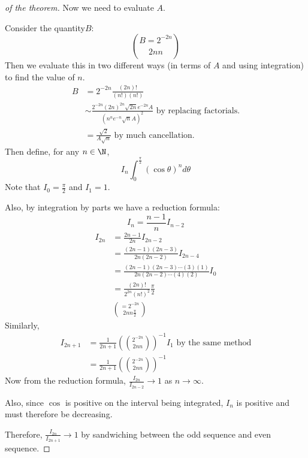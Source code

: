 \documentclass[../Main.tex]{subfiles}
\begin{document}
\begin{proof}[of the theorem]
    \par
    Now we need to evaluate $A$.\par
    Consider the quantity$B$:
    \begin{equation*}
        B = 2^{-2n} \choose{2n}{n}
    \end{equation*}
    Then we evaluate this in two different ways (in terms of $A$ and using integration) to find the value of $n$.
    \begin{align*}
        B &= 2^{-2n} \frac{(2n)!}{(n!)(n!)} \\
        &\sim \frac{2^{-2n} (2n)^{2n} \sqrt{2n} e^{-2n} A}{(n^n e^{-n} \sqrt{n} A)^2} \text{ by replacing factorials.} \\
        &= \frac{\sqrt{2}}{A \sqrt{n}} \text{ by much cancellation.}
    \end{align*}
    Then define, for any $n \in \N$,
    \begin{equation*}
        I_n \int_0^{\frac{\pi}{2}} (\cos{\theta})^n d\theta
    \end{equation*}
    Note that $I_0 = \frac{\pi}{2}$ and $I_1 = 1$.\par
    Also, by integration by parts we have a reduction formula:
    \begin{equation*}
        I_n = \frac{n-1}{n} I_{n-2}
    \end{equation*}
    \begin{align*}
        I_{2n} &= \frac{2n - 1}{2n} I_{2n-2} \\
        &= \frac{(2n-1)(2n-3)}{2n(2n-2)} I_{2n-4} \\
        &= \frac{(2n-1)(2n-3) \cdots(3)(1)}{2n(2n-2) \cdots (4)(2)} I_0 \\
        &= \frac{(2n)!}{2^{2n}(n!)^2} \frac{\pi}{2} \\
        &= 2^{-2n} \choose{2n}{n} \frac{\pi}{2}
    \end{align*}
    Similarly,
    \begin{align*}
        I_{2n+1} &= \frac{1}{2n+1}\left(2^{-2n} \choose{2n}{n}\right)^{-1} I_1 \text{ by the same method} \\
        &= \frac{1}{2n+1}\left(2^{-2n} \choose{2n}{n}\right)^{-1}
    \end{align*}
    Now from the reduction formula, $\frac{I_{2n}}{I_{2n-2}} \to 1$ as $n \to \infty$.\par
    Also, since $\cos$ is positive on the interval being integrated, $I_n$ is positive and must therefore be decreasing.\par
    Therefore, $\frac{I_{2n}}{I_{2n+1}} \to 1$ by sandwiching between the odd sequence and even sequence.\par

\end{proof}
\end{document}

